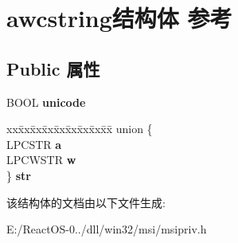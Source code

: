 \hypertarget{structawcstring}{}\section{awcstring结构体 参考}
\label{structawcstring}
\subsection*{Public 属性}
\begin{DoxyCompactItemize}
\item 
\mbox{\label{structawcstring_a63e05c0adb6de48bec99396506228e7d}} 
B\+O\+OL {\bfseries unicode}
\item 
\mbox{\label{structawcstring_a5a9faba2b0ba18d23138c19e0d713d51}} 
\begin{tabbing}
xx\=xx\=xx\=xx\=xx\=xx\=xx\=xx\=xx\=\kill
union \{\\
\>LPCSTR {\bfseries a}\\
\>LPCWSTR {\bfseries w}\\
\} {\bfseries str}\\

\end{tabbing}\end{DoxyCompactItemize}


该结构体的文档由以下文件生成\+:\begin{DoxyCompactItemize}
\item 
E\+:/\+React\+O\+S-\/0../dll/win32/msi/msipriv.\+h\end{DoxyCompactItemize}
